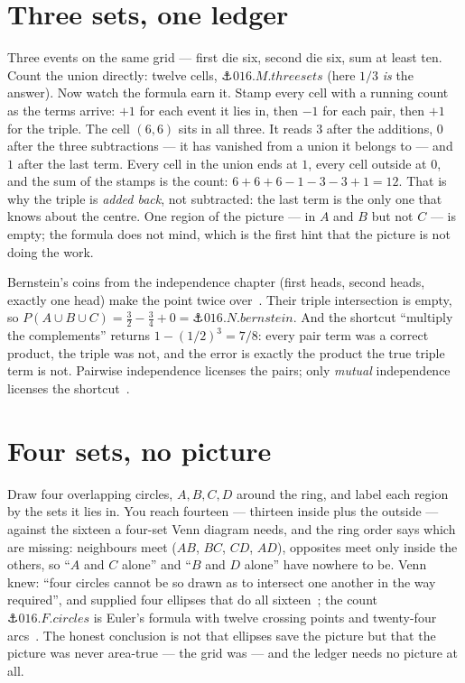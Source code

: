 \begin{narrative}
\section{Three sets, one ledger}

Three events on the same grid — first die six, second die six, sum at
least ten. Count the union directly: twelve cells,
$\anchor{016.M.threesets}$ (here $1/3$ \emph{is} the answer). Now
watch the formula earn it. Stamp every cell with a running count as
the terms arrive: $+1$ for each event it lies in, then $-1$ for each
pair, then $+1$ for the triple. The cell $(6,6)$ sits in all three. It
reads $3$ after the additions, $0$ after the three subtractions — it
has vanished from a union it belongs to — and $1$ after the last term.
Every cell in the union ends at $1$, every cell outside at $0$, and
the sum of the stamps is the count: $6 + 6 + 6 - 1 - 3 - 3 + 1 = 12$.
That is why the triple is \emph{added back}, not subtracted: the last
term is the only one that knows about the centre. One region of the
picture — in $A$ and $B$ but not $C$ — is empty; the formula does not
mind, which is the first hint that the picture is not doing the work.

Bernstein's coins from the independence chapter (first heads, second
heads, exactly one head) make the point twice
over~\cite{probability-alexander-bogomolny-mutually-jointly-independent-events}.
Their triple intersection is empty, so $P(A \cup B \cup C) =
\tfrac32 - \tfrac34 + 0 = \anchor{016.N.bernstein}$. And the shortcut
``multiply the complements'' returns $1 - (1/2)^3 = 7/8$: every pair
term was a correct product, the triple was not, and the error is
exactly the product the true triple term is not. Pairwise independence
licenses the pairs; only \emph{mutual} independence licenses the
shortcut~\cite{probability-wikipedia-pairwise-independence}.

\section{Four sets, no picture}

Draw four overlapping circles, $A, B, C, D$ around the ring, and
label each region by the sets it lies in. You reach fourteen —
thirteen inside plus the outside — against the sixteen a four-set Venn
diagram needs, and the ring order says which are missing: neighbours
meet ($AB$, $BC$, $CD$, $AD$), opposites meet only inside the others,
so ``$A$ and $C$ alone'' and ``$B$ and $D$ alone'' have nowhere to be. Venn knew: ``four circles cannot be so drawn as to
intersect one another in the way required'', and supplied four
ellipses that do all sixteen~\cite{probability-john-venn-symbolic-logic-macmillan-1881};
the count $\anchor{016.F.circles}$ is Euler's formula with twelve
crossing points and twenty-four
arcs~\cite{probability-satyadev-nandakumar-venn-diagrams-and-circles-iit-kanpur}.
The honest conclusion is not that ellipses save the picture but that
the picture was never area-true — the grid was — and the ledger needs
no picture at all.


\end{narrative}
